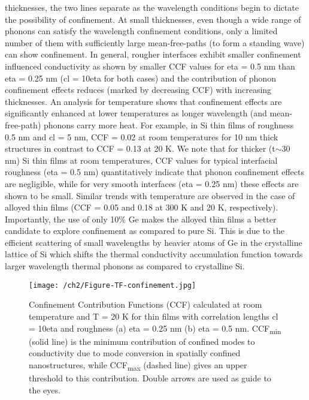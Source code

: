 thicknesses, the two lines separate as the wavelength conditions begin to dictate the possibility of confinement. At small thicknesses, even though a wide range of phonons can satisfy the wavelength confinement conditions, only a limited number of them with sufficiently large mean-free-paths (to form a standing wave) can show confinement. In general, rougher interfaces exhibit smaller confinement influenced conductivity as shown by smaller CCF values for \gls{eta} = 0.5 nm than \gls{eta} = 0.25 nm (\gls{cl} = 10\gls{eta} for both cases) and the contribution of phonon confinement effects reduces (marked by decreasing CCF) with increasing thicknesses. An analysis for temperature shows that confinement effects are significantly enhanced at lower temperatures as longer wavelength (and mean-free-path) phonons carry more heat. For example, in Si thin films of roughness 0.5 nm and \gls{cl} = 5 nm, CCF = 0.02 at room temperatures for 10 nm thick structures in contrast to CCF = 0.13 at 20 K. We note that for thicker (\gls{t}$\sim$30 nm) Si thin films at room temperatures, CCF values for typical interfacial roughness (\gls{eta} = 0.5 nm) quantitatively indicate that phonon confinement effects are negligible, while for very smooth interfaces (\gls{eta} = 0.25 nm) these effects are shown to be small. Similar trends with temperature are observed in the case of  alloyed thin films (CCF = 0.05 and 0.18 at 300 K and 20 K, respectively). Importantly, the use of only 10\% Ge makes the alloyed thin films a better candidate to explore confinement as compared to pure Si. This is due to the efficient scattering of small wavelengths by heavier atoms of Ge in the crystalline lattice of Si which shifts the thermal conductivity accumulation function towards larger wavelength thermal phonons as compared to crystalline Si.
\begin{figure}[hbt]
  \centering \texttt{[image: /ch2/Figure-TF-confinement.jpg]}
  \caption{Confinement Contribution Functions (CCF) calculated at room temperature and \gls{T} = 20 K for thin films with correlation lengths \gls{cl} = 10\gls{eta} and roughness (a) \gls{eta} = 0.25 nm (b) \gls{eta} = 0.5 nm. CCF\textsubscript{min} (solid line) is the minimum contribution of confined modes to conductivity due to mode conversion in spatially confined nanostructures, while CCF\textsubscript{max} (dashed line) gives an upper threshold to this contribution. Double arrows are used as guide to the eyes.}
  \label{fig:ch2-confinement}
\end{figure}

